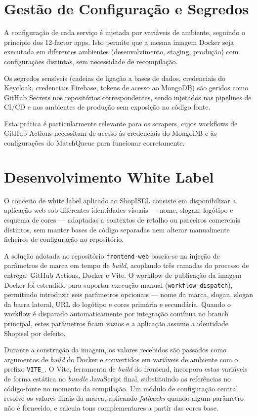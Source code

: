 \section{Gestão de Configuração e Segredos}
\label{sec:5.6}

A configuração de cada serviço é injetada por variáveis de ambiente, seguindo o princípio dos 12-factor apps. Isto permite que a mesma imagem Docker seja executada em diferentes ambientes (desenvolvimento, staging, produção) com configurações distintas, sem necessidade de recompilação.

Os segredos sensíveis (cadeias de ligação a bases de dados, credenciais do Keycloak, credenciais Firebase, tokens de acesso ao MongoDB) são geridos como GitHub Secrets nos repositórios correspondentes, sendo injetados nas pipelines de \ac{CI/CD} e nos ambientes de produção sem exposição no código fonte.

Esta prática é particularmente relevante para os scrapers, cujos workflows de GitHub Actions necessitam de acesso às credenciais do MongoDB e às configurações do MatchQueue para funcionar corretamente.

\section{Desenvolvimento White Label}
\label{sec:5.7}

O conceito de white label aplicado ao ShopISEL consiste em disponibilizar a aplicação web sob diferentes identidades visuais — nome, slogan, logótipo e esquema de cores — adaptadas a contextos de retalho ou parceiros comerciais distintos, sem manter bases de código separadas nem alterar manualmente ficheiros de configuração no repositório.

A solução adotada no repositório \texttt{frontend-web} baseia-se na injeção de parâmetros de marca em tempo de \textit{build}, acoplando três camadas do processo de entrega: GitHub Actions, Docker e Vite. O workflow de publicação da imagem Docker foi estendido para suportar execução manual (\texttt{workflow\_dispatch}), permitindo introduzir seis parâmetros opcionais — nome da marca, slogan, slogan da barra lateral, URL do logótipo e cores primária e secundária. Quando o workflow é disparado automaticamente por integração contínua no branch principal, estes parâmetros ficam vazios e a aplicação assume a identidade Shopisel por defeito.

Durante a construção da imagem, os valores recebidos são passados como argumentos de \textit{build} do Docker e convertidos em variáveis de ambiente com o prefixo \texttt{VITE\_}. O Vite, ferramenta de \textit{build} do frontend, incorpora estas variáveis de forma estática no \textit{bundle} JavaScript final, substituindo as referências no código-fonte no momento da compilação. Um módulo de configuração central resolve os valores finais da marca, aplicando \textit{fallbacks} quando algum parâmetro não é fornecido, e calcula tons complementares a partir das cores base.

